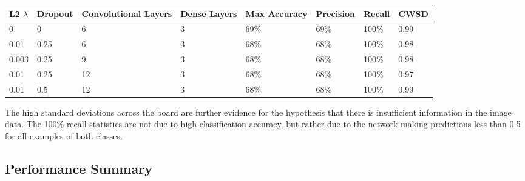 \documentclass[10pt]{article}
\begin{document}
\begin{minipage}{\textwidth}
    \begin{center}
        \begin{tabular}{|l|l|l|l|l|l|l|l|}
            \hline
            L2 $\lambda$ & Dropout & Convolutional Layers & Dense Layers & Max Accuracy & Precision & Recall & CWSD \\
            \hline
            0 & 0 & 6 & 3 & 69\% & 69\% & 100\% & 0.99 \\
            \hline
            0.01 & 0.25 & 6 & 3 & 68\% & 68\% & 100\% & 0.98 \\
            \hline
            0.003 & 0.25 & 9 & 3 & 68\% & 68\% & 100\% & 0.98 \\
            \hline
            0.01 & 0.25 & 12 & 3 & 68\% & 68\% & 100\% & 0.97 \\
            \hline
            0.01 & 0.5 & 12 & 3 & 68\% & 68\% & 100\% & 0.99 \\
            \hline
        \end{tabular}
    \end{center}
\end{minipage}

The high standard deviations across the board are further evidence for the hypothesis that there is insufficient information in the image data. The 100\% recall statistics are not due to high classification accuracy, but rather due to the network making predictions less than 0.5 for all examples of both classes.

\subsection{Performance Summary}
\end{document}
